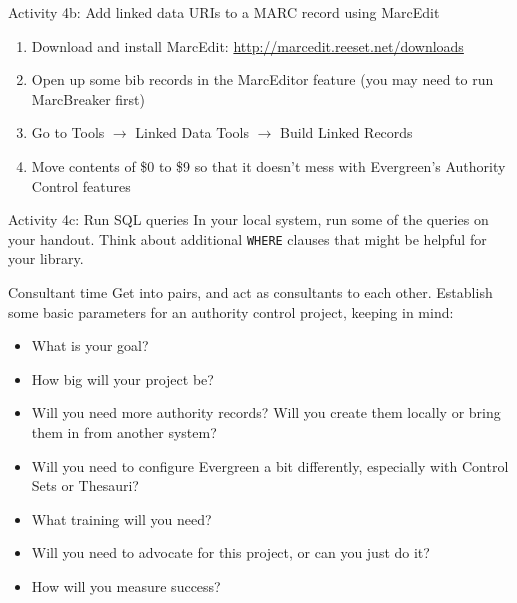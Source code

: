 \documentclass{beamer}
\begin{document}
\begin{frame}{Activity 4b: Add linked data URIs to a MARC record using MarcEdit}
 \begin{enumerate}
  \item Download and install MarcEdit: \url{http://marcedit.reeset.net/downloads}
  \item Open up some bib records in the MarcEditor feature (you may need to run MarcBreaker first)
  \item Go to Tools $\rightarrow$ Linked Data Tools $\rightarrow$ Build Linked Records
  \item Move contents of \$0 to \$9 so that it doesn't mess with Evergreen's Authority Control features
  
 \end{enumerate}

\end{frame}

\begin{frame}{Activity 4c: Run SQL queries}
In your local system, run some of the queries on your handout.  Think about additional \texttt{WHERE} clauses that might be helpful for your library.
\end{frame}



\begin{frame}{Consultant time}
Get into pairs, and act as consultants to each other.  Establish some basic parameters for an authority control project, keeping in mind:

\begin{itemize}
\item What is your goal?
\item How big will your project be?
 \item Will you need more authority records?  Will you create them locally or bring them in from another system?
 \item Will you need to configure Evergreen a bit differently, especially with Control Sets or Thesauri?
 \item What training will you need?
 \item Will you need to advocate for this project, or can you just do it?
 \item How will you measure success?
\end{itemize}


\end{frame}
\end{document}
